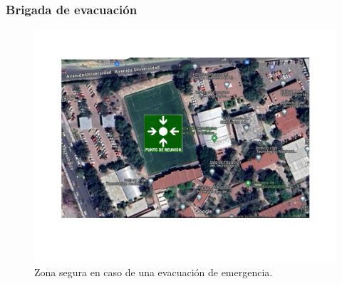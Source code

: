     \subsubsection{Brigada de evacuación}
    
    \begin{figure}[H]
        \centering
        \includegraphics[trim = {20mm 10mm 10mm 16mm},clip,scale=0.30]{1/img/Punto_reunion.pdf}
        \caption{Zona segura en caso de una evacuación de emergencia. }
        \label{fig:Punto_reunion}
    \end{figure}
